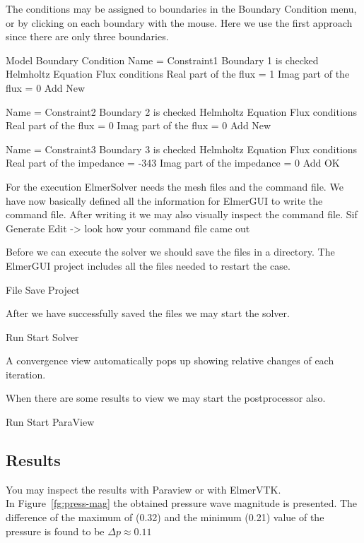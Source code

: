 The conditions may be assigned to boundaries in the Boundary Condition menu, or by clicking on each boundary with the mouse. Here we use the first approach since there are only three boundaries.

\ttbegin
Model
  Boundary Condition
    Name = Constraint1
    Boundary 1 is checked
    Helmholtz Equation
      Flux conditions
        Real part of the flux = 1
        Imag part of the flux = 0
    Add
    New

    Name = Constraint2
    Boundary 2 is checked
    Helmholtz Equation
      Flux conditions
        Real part of the flux = 0
        Imag part of the flux = 0
    Add
    New

    Name = Constraint3
    Boundary 3 is checked
    Helmholtz Equation
      Flux conditions
        Real part of the impedance = -343
        Imag part of the impedance = 0
    Add
   OK 
\ttend   

For the execution ElmerSolver needs the mesh files and the command file.  We have now basically defined all the information for ElmerGUI to write the command file. After writing it we may also visually inspect the command file.
\ttbegin
Sif 
  Generate
  Edit -> look how your command file came out  
\ttend

Before we can execute the solver we should save the files in a directory.  The ElmerGUI project includes all the files needed to restart the case.

\ttbegin
File 
  Save Project
\ttend

After we have successfully saved the files we may start the solver.

\ttbegin
Run
  Start Solver
\ttend

A convergence view automatically pops up showing relative changes of each iteration.

When there are some results to view we may start the postprocessor also.

\ttbegin
Run
  Start ParaView
\ttend

\subsection*{Results}

You may inspect the results with Paraview or with ElmerVTK.\\

In Figure~\ref{fg:press-mag} the obtained pressure wave magnitude is presented.
 The difference of the maximum of (0.32) and the minimum (0.21) value of the
pressure is found to be $\Delta p \approx 0.11$\\


